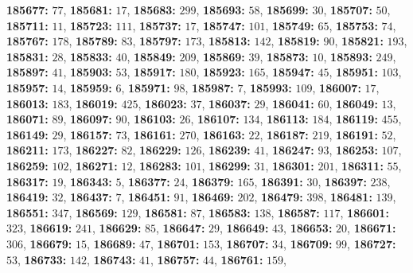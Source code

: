 \textsf{\bfseries 185677:} $77$, \textsf{\bfseries 185681:} $17$, \textsf{\bfseries 185683:} $299$, \textsf{\bfseries 185693:} $58$, \textsf{\bfseries 185699:} $30$, \textsf{\bfseries 185707:} $50$, \textsf{\bfseries 185711:} $11$, \textsf{\bfseries 185723:} $111$, \textsf{\bfseries 185737:} $17$, \textsf{\bfseries 185747:} $101$, \textsf{\bfseries 185749:} $65$, \textsf{\bfseries 185753:} $74$, \textsf{\bfseries 185767:} $178$, \textsf{\bfseries 185789:} $83$, \textsf{\bfseries 185797:} $173$, \textsf{\bfseries 185813:} $142$, \textsf{\bfseries 185819:} $90$, \textsf{\bfseries 185821:} $193$, \textsf{\bfseries 185831:} $28$, \textsf{\bfseries 185833:} $40$, \textsf{\bfseries 185849:} $209$, \textsf{\bfseries 185869:} $39$, \textsf{\bfseries 185873:} $10$, \textsf{\bfseries 185893:} $249$, \textsf{\bfseries 185897:} $41$, \textsf{\bfseries 185903:} $53$, \textsf{\bfseries 185917:} $180$, \textsf{\bfseries 185923:} $165$, \textsf{\bfseries 185947:} $45$, \textsf{\bfseries 185951:} $103$, \textsf{\bfseries 185957:} $14$, \textsf{\bfseries 185959:} $6$, \textsf{\bfseries 185971:} $98$, \textsf{\bfseries 185987:} $7$, \textsf{\bfseries 185993:} $109$, \textsf{\bfseries 186007:} $17$, \textsf{\bfseries 186013:} $183$, \textsf{\bfseries 186019:} $425$, \textsf{\bfseries 186023:} $37$, \textsf{\bfseries 186037:} $29$, \textsf{\bfseries 186041:} $60$, \textsf{\bfseries 186049:} $13$, \textsf{\bfseries 186071:} $89$, \textsf{\bfseries 186097:} $90$, \textsf{\bfseries 186103:} $26$, \textsf{\bfseries 186107:} $134$, \textsf{\bfseries 186113:} $184$, \textsf{\bfseries 186119:} $455$, \textsf{\bfseries 186149:} $29$, \textsf{\bfseries 186157:} $73$, \textsf{\bfseries 186161:} $270$, \textsf{\bfseries 186163:} $22$, \textsf{\bfseries 186187:} $219$, \textsf{\bfseries 186191:} $52$, \textsf{\bfseries 186211:} $173$, \textsf{\bfseries 186227:} $82$, \textsf{\bfseries 186229:} $126$, \textsf{\bfseries 186239:} $41$, \textsf{\bfseries 186247:} $93$, \textsf{\bfseries 186253:} $107$, \textsf{\bfseries 186259:} $102$, \textsf{\bfseries 186271:} $12$, \textsf{\bfseries 186283:} $101$, \textsf{\bfseries 186299:} $31$, \textsf{\bfseries 186301:} $201$, \textsf{\bfseries 186311:} $55$, \textsf{\bfseries 186317:} $19$, \textsf{\bfseries 186343:} $5$, \textsf{\bfseries 186377:} $24$, \textsf{\bfseries 186379:} $165$, \textsf{\bfseries 186391:} $30$, \textsf{\bfseries 186397:} $238$, \textsf{\bfseries 186419:} $32$, \textsf{\bfseries 186437:} $7$, \textsf{\bfseries 186451:} $91$, \textsf{\bfseries 186469:} $202$, \textsf{\bfseries 186479:} $398$, \textsf{\bfseries 186481:} $139$, \textsf{\bfseries 186551:} $347$, \textsf{\bfseries 186569:} $129$, \textsf{\bfseries 186581:} $87$, \textsf{\bfseries 186583:} $138$, \textsf{\bfseries 186587:} $117$, \textsf{\bfseries 186601:} $323$, \textsf{\bfseries 186619:} $241$, \textsf{\bfseries 186629:} $85$, \textsf{\bfseries 186647:} $29$, \textsf{\bfseries 186649:} $43$, \textsf{\bfseries 186653:} $20$, \textsf{\bfseries 186671:} $306$, \textsf{\bfseries 186679:} $15$, \textsf{\bfseries 186689:} $47$, \textsf{\bfseries 186701:} $153$, \textsf{\bfseries 186707:} $34$, \textsf{\bfseries 186709:} $99$, \textsf{\bfseries 186727:} $53$, \textsf{\bfseries 186733:} $142$, \textsf{\bfseries 186743:} $41$, \textsf{\bfseries 186757:} $44$, \textsf{\bfseries 186761:} $159$, 
